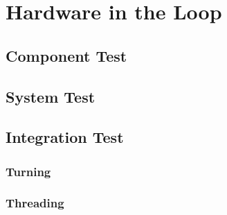 \section{Hardware in the Loop}
\subsection{Component Test}
\subsection{System Test}
\subsection{Integration Test}
\subsubsection{Turning}
\subsubsection{Threading}










